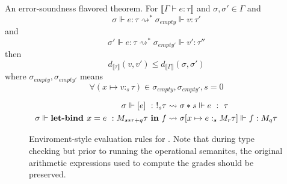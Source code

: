 An error-soundness flavored theorem. For $\llbracket \Gamma \vdash e : \tau
\rrbracket$ and $\sigma, \sigma' \in \Gamma$ and
$$\sigma \Vdash e : \tau \rightsquigarrow^* \sigma_{empty} \Vdash v : \tau'$$ 
and 
$$\sigma' \Vdash e : \tau \rightsquigarrow^* \sigma_{empty'} \Vdash v' : \tau''$$
then
$$
d_{\llbracket \tau \rrbracket}(v, v') \leq d_{\llbracket \Gamma \rrbracket}(\sigma, \sigma')
$$
where $\sigma_{empty}, \sigma_{empty'}$ means
$$
\forall (x \mapsto v :_s \tau) \in \sigma_{empty}, \sigma_{empty'}, s = 0
$$

\begin{figure}
\begin{center}
\begin{equation*}
  \begin{aligned}[c]
    \sigma \Vdash [e] \ : \ !_s \tau &\rightsquigarrow \sigma * s \Vdash e \ : \ \tau \\
    \sigma \Vdash \textbf{let-bind } x = e \ : M_{s * r + q} \tau \ \textbf{in} \ f &\rightsquigarrow \sigma[x
    \mapsto e :_s M_r \tau]
    \Vdash f : M_q \tau \\
  \end{aligned}
\end{equation*}

\end{center}
    \caption{Enviroment-style evaluation rules for \Lang. Note that during type
    checking but prior to running the operational semanitcs, the original
    arithmetic expressions used to compute the grades should be preserved.}
    \label{fig:sub_eval_rules}
\end{figure}
